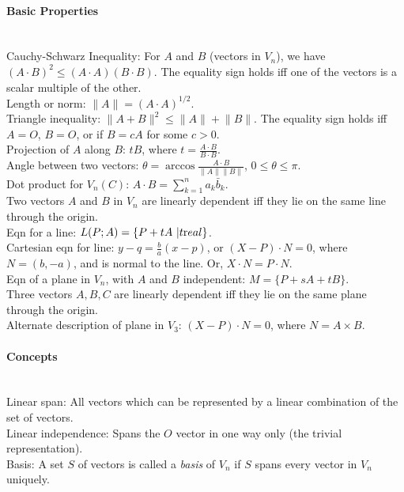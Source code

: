 \documentclass[10pt]{article}
\begin{document}
\paragraph{Basic Properties}\ \\
Cauchy-Schwarz Inequality:  For $A$ and $B$ (vectors in $V_n$), we have $(A \cdot B)^2 \leq (A\cdot A)(B \cdot B)$.  The equality sign
holds iff one of the vectors is a scalar multiple of the other.\\
Length or norm:  $\lVert A \rVert = (A \cdot A)^{1/2}$.\\
Triangle inequality:  $\lVert A+B \rVert^2 \leq \lVert A \rVert + \lVert B \rVert$.  The equality sign holds
iff $A = O$, $B = O$, or if $B = cA$ for some $c > 0$.\\
Projection of $A$ along $B$:  $tB$, where $t=\frac{A \cdot B}{B \cdot B}$.\\
Angle between two vectors:  $\theta = \arccos \frac{A \cdot B}{\lVert A\rVert \lVert B\rVert}$, $0 \leq\theta\leq\pi$.\\
Dot product for $V_n(C)$:  $A \cdot B = \sum_{k=1}^n a_k \bar{b}_k$.\\
Two vectors $A$ and $B$ in $V_n$ are linearly dependent iff they lie on the same line through the origin.\\
Eqn for a line: $L(P; A) = \{P + tA\ | t {\text real}\}$.\\
Cartesian eqn for line: $y-q=\frac{b}{a}(x-p)$, or $(X-P)\cdot N = 0$, where $N = (b, -a)$, and is normal to the line.
Or, $X \cdot N = P\cdot N$.\\
Eqn of a plane in $V_n$, with $A$ and $B$ independent: $M=\{P+sA+tB\}$.\\
Three vectors $A, B, C$ are linearly dependent iff they lie on the same plane through the origin.\\
Alternate description of plane in $V_3$: $(X-P)\cdot N = 0$, where $N=A\times B$.

\paragraph{Concepts}\ \\
Linear span:  All vectors which can be represented by a linear combination of the set of vectors.\\
Linear independence:  Spans the $O$ vector in one way only (the trivial representation).\\
Basis:  A set $S$ of vectors is called a {\it basis} of $V_n$ if $S$ spans every vector in $V_n$ uniquely.
\end{document}

